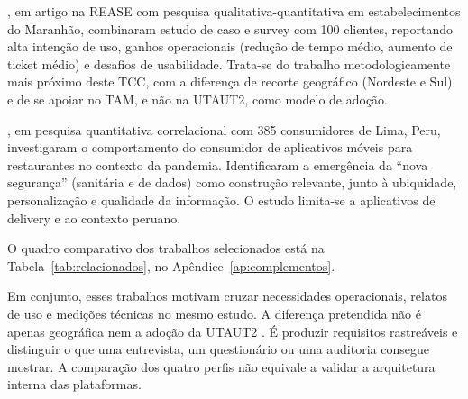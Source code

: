 , em artigo na REASE com pesquisa qualitativa-quantitativa em estabelecimentos do Maranhão, combinaram estudo de caso e survey com 100 clientes, reportando alta intenção de uso, ganhos operacionais (redução de tempo médio, aumento de ticket médio) e desafios de usabilidade. Trata-se do trabalho metodologicamente mais próximo deste TCC, com a diferença de recorte geográfico (Nordeste e Sul) e de se apoiar no TAM, e não na UTAUT2, como modelo de adoção.

, em pesquisa quantitativa correlacional com 385 consumidores de Lima, Peru, investigaram o comportamento do consumidor de aplicativos móveis para restaurantes no contexto da pandemia. Identificaram a emergência da ``nova segurança'' (sanitária e de dados) como construção relevante, junto à ubiquidade, personalização e qualidade da informação. O estudo limita-se a aplicativos de delivery e ao contexto peruano.

O quadro comparativo dos trabalhos selecionados está na Tabela~\ref{tab:relacionados}, no Apêndice~\ref{ap:complementos}.

Em conjunto, esses trabalhos motivam cruzar necessidades operacionais, relatos de uso e medições técnicas no mesmo estudo. A diferença pretendida não é apenas geográfica nem a adoção da UTAUT2 \cite{venkatesh2012consumer}. É produzir requisitos rastreáveis e distinguir o que uma entrevista, um questionário ou uma auditoria consegue mostrar. A comparação dos quatro perfis não equivale a validar a arquitetura interna das plataformas.
